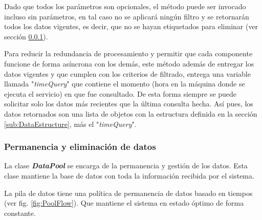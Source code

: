             
            
            Dado que todos los parámetros son opcionales, el método puede ser invocado incluso sin parámetros, en tal caso no se aplicará ningún filtro y se retornarán todos los datos vigentes, es decir, que no se hayan etiquetados para eliminar (ver sección \ref{sub2:PoolKeepDropData}).
            
            Para reducir la redundancia de procesamiento y permitir que cada componente funcione de forma asíncrona con los demás, este método además de entregar los datos vigentes y que cumplen con los criterios de filtrado, entrega una variable llamada "\textit{timeQuery}" que contiene el momento (hora en la máquina donde se ejecuta el servicio) en que fue consultado. De esta forma siempre se puede solicitar solo los datos más recientes que la última consulta hecha. Así pues, los datos retornados son una lista de objetos con la estructura definida en la sección \ref{sub:DataEstructure}, más el "\textit{timeQuery}".

        \subsubsection{Permanencia y eliminación de datos}
        \label{sub2:PoolKeepDropData}
        
            La clase \textbf{\textit{DataPool}} se encarga de la permanencia y gestión de los datos. Esta clase mantiene la base de datos con toda la información recibida por el sistema.
            
            La pila de datos tiene una política de permanencia de datos basado en tiempos (ver fig. \ref{fig:PoolFlow}). Que mantiene el sistema en estado óptimo de forma constante.
            
